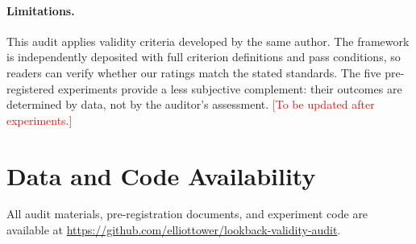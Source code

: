 \documentclass[11pt]{article}
\begin{document}
\paragraph{Limitations.}
This audit applies validity criteria developed by the same author. The framework is independently deposited with full criterion definitions and pass conditions, so readers can verify whether our ratings match the stated standards. The five pre-registered experiments provide a less subjective complement: their outcomes are determined by data, not by the auditor's assessment. \textcolor{red}{[To be updated after experiments.]}


\section*{Data and Code Availability}

All audit materials, pre-registration documents, and experiment code are available at \url{https://github.com/elliottower/lookback-validity-audit}.




\end{document}
